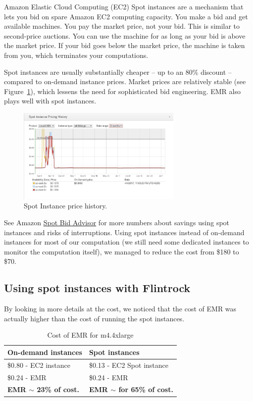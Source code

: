 \documentclass{acm_proc_article-sp}
\begin{document}
Amazon Elastic Cloud Computing (EC2) Spot instances are a mechanism that lets you bid on spare Amazon EC2 computing capacity. You make a bid and get available machines. You pay the market price, not your bid. This is similar to second-price auctions. You can use the machine for as long as your bid is above the market price. If your bid goes below the market price, the machine is taken from you, which terminates your computations. 

Spot instances are usually substantially cheaper -- up to an 80\% discount -- compared to on-demand instance prices. Market prices are relatively stable (see Figure~\ref{fig::spot-price-history}), which lessens the need for sophisticated bid engineering. EMR also plays well with spot instances.

\begin{figure}[h]
    \centering
    \includegraphics[width=8cm]{IMG/spot-price.jpg}
    \caption{Spot Instance price history.}
    \label{fig::spot-price-history}
\end{figure}

See Amazon \href{https://aws.amazon.com/ec2/spot/bid-advisor/}{Spot Bid Advisor} for more numbers about savings using spot instances and risks of interruptions.
Using spot instances instead of on-demand instances for most of our computation (we still need some dedicated instances to  monitor the computation itself), we managed to reduce the cost from \$180 to \$70.

\subsection{Using spot instances with Flintrock}
By looking in more details at the cost, we noticed that the cost of EMR was actually higher than the cost of running the spot instances.

\begin{table}[h!]
    \centering
    \begin{tabular}{|l|l|}
    On-demand instances & Spot instances\\ \hline
    \$0.80 - EC2 instance          & \$0.13 - EC2 Spot instance\\
    \$0.24 - EMR                   & \$0.24 - EMR\\
    {\bf EMR $\sim$ 23\% of cost.} & {\bf EMR $\sim$ for 65\% of cost.}
    \end{tabular}
    \caption{Cost of EMR for m4.4xlarge}
    \label{table:cost-EMR}
    \end{table}
\end{document}
